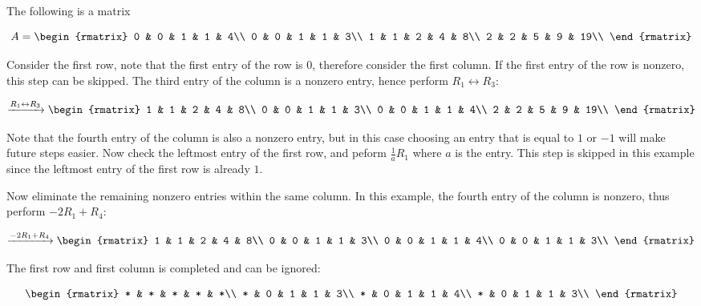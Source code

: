 \documentclass[a4paper,12pt]{article}
\begin{document}
\begin{exm}
  The following is a matrix

  $$A=\begin{rmatrix}
  0 & 0 & 1 & 1 & 4\\
  0 & 0 & 1 & 1 & 3\\
  1 & 1 & 2 & 4 & 8\\
  2 & 2 & 5 & 9 & 19\\
  \end{rmatrix}$$\s

  Consider the first row, note that the first entry of the row is $0$, therefore consider the first column. If the first entry of the row is nonzero, this step can be skipped. The third entry of the column is a nonzero entry, hence perform $R_{1}\leftrightarrow R_{3}$:

  $$\xrightarrow[ ]{R_{1}\leftrightarrow R_{3}}\begin{rmatrix}
  1 & 1 & 2 & 4 & 8\\
  0 & 0 & 1 & 1 & 3\\
  0 & 0 & 1 & 1 & 4\\
  2 & 2 & 5 & 9 & 19\\
  \end{rmatrix}$$\s

  Note that the fourth entry of the column is also a nonzero entry, but in this case choosing an entry that is equal to $1$ or $-1$ will make future steps easier. Now check the leftmost entry of the first row, and peform $\frac{1}{a}R_{1}$ where $a$ is the entry. This step is skipped in this example since the leftmost entry of the first row is already $1$.\n

  Now eliminate the remaining nonzero entries within the same column. In this example, the fourth entry of the column is nonzero, thus perform $-2R_{1}+R_{4}$:

  $$\xrightarrow[ ]{-2R_{1}+R_{4}}\begin{rmatrix}
  1 & 1 & 2 & 4 & 8\\
  0 & 0 & 1 & 1 & 3\\
  0 & 0 & 1 & 1 & 4\\
  0 & 0 & 1 & 1 & 3\\
  \end{rmatrix}$$\s

  The first row and first column is completed and can be ignored:

  $$\begin{rmatrix}
  * & * & * & * & *\\
  * & 0 & 1 & 1 & 3\\
  * & 0 & 1 & 1 & 4\\
  * & 0 & 1 & 1 & 3\\
  \end{rmatrix}$$\s


\end{exm}
\end{document}
